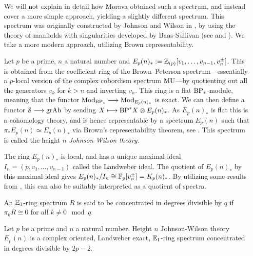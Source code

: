 We will not explain in detail how Morava obtained such a spectrum, and instead cover a more simple approach, yielding a slightly different spectrum. This spectrum was originally constructed by Johnson and Wilson in \cite{johnson-wilson_75}, by using the theory of manifolds with singularities developed by Baas-Sullivan (see \cite{baas_73a} and \cite{baas_73b}). We take a more modern approach, utilizing Brown representability. 

\begin{construction}
    Let $p$ be a prime, $n$ a natural number and $E_p(n)_* := \mathbb{Z}_{(p)}[v_1, \ldots, v_{n-1}, v_n^{\pm}]$. This is obtained from the coefficient ring of the Brown--Peterson spectrum---essentially a $p$-local version of the complex cobordism spectrum $\mathrm{MU}$---by quotienting out all the generators $v_k$ for $k>n$ and inverting $v_n$. This ring is a flat $\mathrm{BP}_*$-module, meaning that the functor $\mathrm{Mod}_{\mathrm{BP}_*}\longrightarrow \mathrm{Mod}_{E_p(n)_*}$ is exact. We can then define a functor $\EuScript{S} \longrightarrow \mathrm{gr}\mathrm{Ab}$ by sending $X \longmapsto \mathrm{BP}^* X\otimes E_p(n)_*$. As $E_p(n)_*$ is flat this is a cohomology theory, and is hence representable by a spectrum $E_p(n)$ such that $\pi_* E_p(n) \simeq E_p(n)_*$ via Brown's representability theorem, see \cite[Theorem 1]{brown_1962}. This spectrum is called the height $n$ \emph{Johnson-Wilson theory}. 
\end{construction}

\begin{remark}
    \label{ch0:rm:K-as-quotient-of-E}
    The ring $E_p(n)_*$ is local, and has a unique maximal ideal $I_n = (p, v_1, \ldots, v_{n-1})$ called the Landweber ideal. The quotient of $E_p(n)_*$ by this maximal ideal gives $E_p(n)_*/I_n \cong \mathbb{F}_p[v_n^{\pm}] = K_p(n)_*$. By utilizing some results from \cite{elmanto-kolderup_2020}, this can also be suitably interpreted as a quotient of spectra. 
\end{remark}

\begin{definition}
    An $\mathbb{E}_1$-ring spectrum $R$ is said to be concentrated in degrees divisible by $q$ if $\pi_k R \cong 0$ for all $k \not = 0 \mod q$. 
\end{definition}

\begin{proposition}
    \label{ch0:prop:Johnson-Wilson-properties}
    Let $p$ be a prime and $n$ a natural number. Height $n$ Johnson-Wilson theory $E_p(n)$ is a complex oriented, Landweber exact, $\mathbb{E}_1$-ring spectrum concentrated in degrees divisible by $2p-2$. 
\end{proposition}

